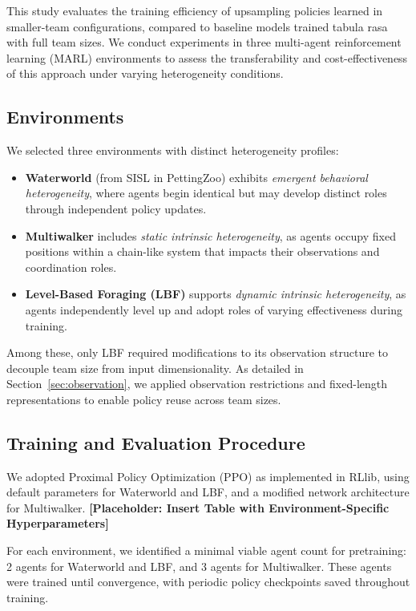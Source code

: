 \documentclass{article}
\begin{document}
This study evaluates the training efficiency of upsampling policies learned in smaller-team configurations, compared to baseline models trained tabula rasa with full team sizes. We conduct experiments in three multi-agent reinforcement learning (MARL) environments to assess the transferability and cost-effectiveness of this approach under varying heterogeneity conditions.

\subsection{Environments}

We selected three environments with distinct heterogeneity profiles:
\begin{itemize}
    \item \textbf{Waterworld} \cite{gupta2017} (from SISL in PettingZoo) exhibits \emph{emergent behavioral heterogeneity}, where agents begin identical but may develop distinct roles through independent policy updates.
    \item \textbf{Multiwalker} \cite{gupta2017} includes \emph{static intrinsic heterogeneity}, as agents occupy fixed positions within a chain-like system that impacts their observations and coordination roles.
    \item \textbf{Level-Based Foraging (LBF)} \cite{papoudakis2021} supports \emph{dynamic intrinsic heterogeneity}, as agents independently level up and adopt roles of varying effectiveness during training.
\end{itemize}

Among these, only LBF required modifications to its observation structure to decouple team size from input dimensionality. As detailed in Section~\ref{sec:observation}, we applied observation restrictions and fixed-length representations to enable policy reuse across team sizes.

\subsection{Training and Evaluation Procedure}

We adopted Proximal Policy Optimization (PPO) as implemented in RLlib, using default parameters for Waterworld and LBF, and a modified network architecture for Multiwalker. \textbf{[Placeholder: Insert Table with Environment-Specific Hyperparameters]}

For each environment, we identified a minimal viable agent count for pretraining: 2 agents for Waterworld and LBF, and 3 agents for Multiwalker. These agents were trained until convergence, with periodic policy checkpoints saved throughout training.
\end{document}
